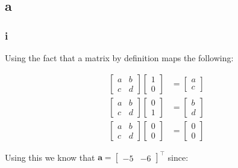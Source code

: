 \documentclass{article}
\begin{document}
\subsection{a}
\subsubsection{i}

Using the fact that a matrix by definition maps the following:

\begin{align*}
    \begin{bmatrix}
        a & b \\ c & d
    \end{bmatrix}
    \begin{bmatrix} 1 \\ 0 \end{bmatrix}
    & =
    \begin{bmatrix} a \\ c \end{bmatrix}
    \\
    \begin{bmatrix}
        a & b \\ c & d
    \end{bmatrix}
    \begin{bmatrix} 0 \\ 1 \end{bmatrix}
    & =
    \begin{bmatrix} b \\ d \end{bmatrix}
    \\
    \begin{bmatrix}
        a & b \\ c & d
    \end{bmatrix}
    \begin{bmatrix} 0 \\ 0 \end{bmatrix}
    & =
    \begin{bmatrix} 0 \\ 0 \end{bmatrix}
\end{align*}

Using this we know that $\mathbf a = \begin{bmatrix} -5 & -6\end{bmatrix}^\top$ since:
\end{document}
